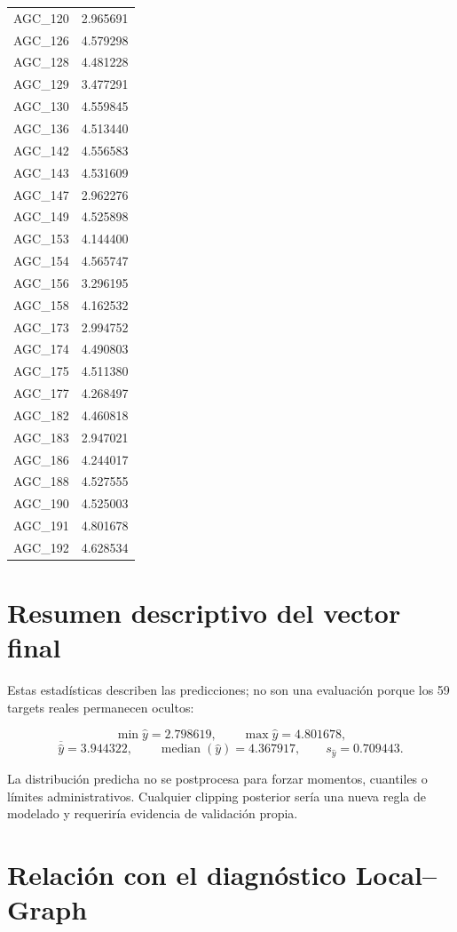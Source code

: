 \begin{longtable}{lr}
AGC\_120 & 2.965691 \\
AGC\_126 & 4.579298 \\
AGC\_128 & 4.481228 \\
AGC\_129 & 3.477291 \\
AGC\_130 & 4.559845 \\
AGC\_136 & 4.513440 \\
AGC\_142 & 4.556583 \\
AGC\_143 & 4.531609 \\
AGC\_147 & 2.962276 \\
AGC\_149 & 4.525898 \\
AGC\_153 & 4.144400 \\
AGC\_154 & 4.565747 \\
AGC\_156 & 3.296195 \\
AGC\_158 & 4.162532 \\
AGC\_173 & 2.994752 \\
AGC\_174 & 4.490803 \\
AGC\_175 & 4.511380 \\
AGC\_177 & 4.268497 \\
AGC\_182 & 4.460818 \\
AGC\_183 & 2.947021 \\
AGC\_186 & 4.244017 \\
AGC\_188 & 4.527555 \\
AGC\_190 & 4.525003 \\
AGC\_191 & 4.801678 \\
AGC\_192 & 4.628534 \\
\bottomrule
\end{longtable}

\section{Resumen descriptivo del vector final}

Estas estadísticas describen las predicciones; no son una evaluación porque los 59 targets
reales permanecen ocultos:

\[
\min \hat y=2.798619,\qquad
\max \hat y=4.801678,
\]
\[
\overline{\hat y}=3.944322,\qquad
\operatorname{median}(\hat y)=4.367917,\qquad
s_{\hat y}=0.709443.
\]

La distribución predicha no se postprocesa para forzar momentos, cuantiles o límites
administrativos. Cualquier clipping posterior sería una nueva regla de modelado y requeriría
evidencia de validación propia.

\section{Relación con el diagnóstico Local--Graph}

